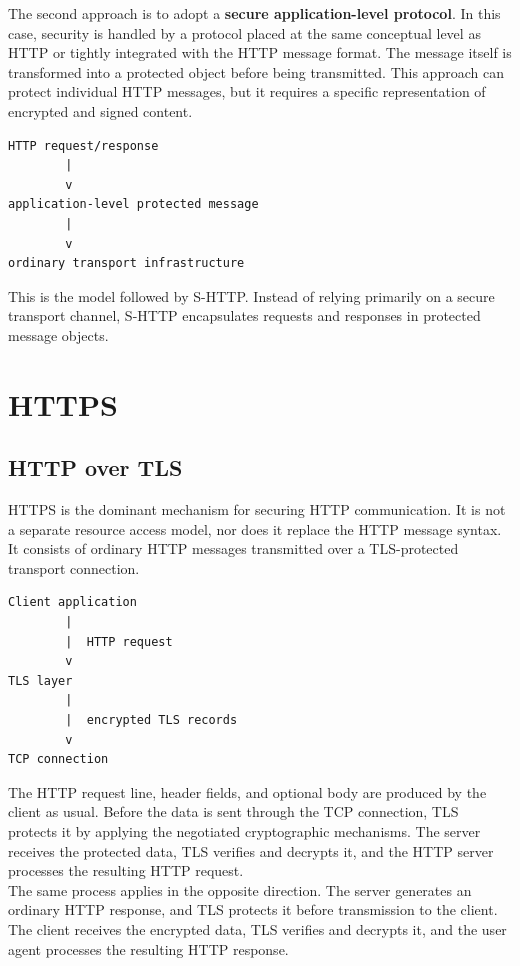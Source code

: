 \documentclass{scrbook}
\begin{document}
The second approach is to adopt a \textbf{secure application-level protocol}. In this case, security is handled by a protocol placed at the same conceptual level as HTTP or tightly integrated with the HTTP message format. The message itself is transformed into a protected object before being transmitted. This approach can protect individual HTTP messages, but it requires a specific representation of encrypted and signed content.

\begin{lstlisting}
HTTP request/response
        |
        v
application-level protected message
        |
        v
ordinary transport infrastructure
\end{lstlisting}

This is the model followed by S-HTTP. Instead of relying primarily on a secure transport channel, S-HTTP encapsulates requests and responses in protected message objects.

\section{HTTPS}

\subsection{HTTP over TLS}

HTTPS is the dominant mechanism for securing HTTP communication. It is not a separate resource access model, nor does it replace the HTTP message syntax. It consists of ordinary HTTP messages transmitted over a TLS-protected transport connection.

\begin{lstlisting}
Client application
        |
        |  HTTP request
        v
TLS layer
        |
        |  encrypted TLS records
        v
TCP connection
\end{lstlisting}

The HTTP request line, header fields, and optional body are produced by the client as usual. Before the data is sent through the TCP connection, TLS protects it by applying the negotiated cryptographic mechanisms. The server receives the protected data, TLS verifies and decrypts it, and the HTTP server processes the resulting HTTP request.\\

The same process applies in the opposite direction. The server generates an ordinary HTTP response, and TLS protects it before transmission to the client. The client receives the encrypted data, TLS verifies and decrypts it, and the user agent processes the resulting HTTP response.
\end{document}
